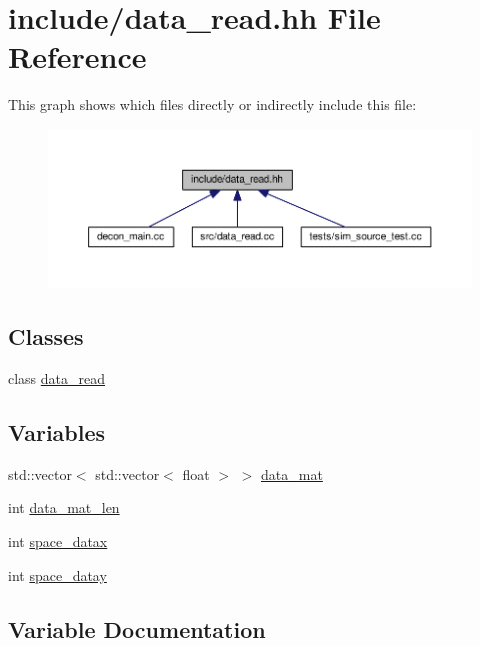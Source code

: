 \hypertarget{data__read_8hh}{}\section{include/data\+\_\+read.hh File Reference}
\label{data__read_8hh}
This graph shows which files directly or indirectly include this file\+:
\nopagebreak
\begin{figure}[H]
\begin{center}
\leavevmode
\includegraphics[width=350pt]{data__read_8hh__dep__incl}
\end{center}
\end{figure}
\subsection*{Classes}
\begin{DoxyCompactItemize}
\item 
class \mbox{\hyperlink{classdata__read}{data\+\_\+read}}
\end{DoxyCompactItemize}
\subsection*{Variables}
\begin{DoxyCompactItemize}
\item 
std\+::vector$<$ std\+::vector$<$ float $>$ $>$ \mbox{\hyperlink{data__read_8hh_aa3c8f7c0bda5a845913562e28f9c1818}{data\+\_\+mat}}
\item 
int \mbox{\hyperlink{data__read_8hh_a1adfbfbc200c1f97d6055449f7815076}{data\+\_\+mat\+\_\+len}}
\item 
int \mbox{\hyperlink{data__read_8hh_aca3c1d36b05c2731d7276b0acc029b3f}{space\+\_\+datax}}
\item 
int \mbox{\hyperlink{data__read_8hh_a6b37b7991c3851b6fa90ef56decee739}{space\+\_\+datay}}
\end{DoxyCompactItemize}


\subsection{Variable Documentation}
\mbox{\label{data__read_8hh_aa3c8f7c0bda5a845913562e28f9c1818}} 
